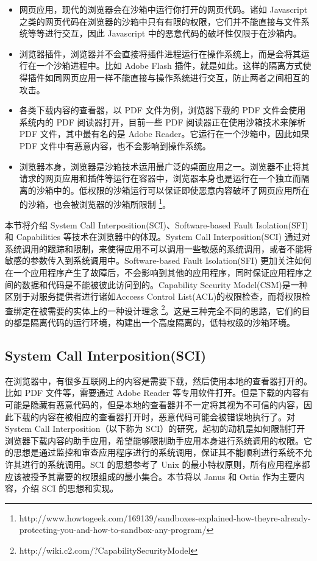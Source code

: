 \documentclass[final,5p,times]{elsarticle}
\begin{document}
\begin{itemize}
\item
网页应用，现代的浏览器会在沙箱中运行你打开的网页代码。诸如 Javascript 之类的网页代码在浏览器的沙箱中只有有限的权限，它们并不能直接与文件系统等等进行交互，因此 Javascript 中的恶意代码的破坏性仅限于在沙箱内。
\item
浏览器插件，浏览器并不会直接将插件进程运行在操作系统上，而是会将其运行在一个沙箱进程中。比如 Adobe Flash 插件，就是如此。这样的隔离方式使得插件如同网页应用一样不能直接与操作系统进行交互，防止两者之间相互的攻击。
\item
各类下载内容的查看器，以 PDF 文件为例，浏览器下载的 PDF 文件会使用系统内的 PDF 阅读器打开，目前一些 PDF 阅读器正在使用沙箱技术来解析 PDF 文件，其中最有名的是 Adobe Reader。它运行在一个沙箱中，因此如果 PDF 文件中有恶意内容，也不会影响到操作系统。
\item
浏览器本身，浏览器是沙箱技术运用最广泛的桌面应用之一。浏览器不止将其请求的网页应用和插件等运行在容器中，浏览器本身也是运行在一个独立而隔离的沙箱中的。低权限的沙箱运行可以保证即使恶意内容破坏了网页应用所在的沙箱，也会被浏览器的沙箱所限制 \footnote{http://www.howtogeek.com/169139/sandboxes-explained-how-theyre-already-protecting-you-and-how-to-sandbox-any-program/}。
\end{itemize}

本节将介绍 System Call Interposition(SCI)、Software-based Fault Isolation(SFI) 和 Capabilities 等技术在浏览器中的体现。System Call Interposition(SCI) 通过对系统调用的跟踪和限制，来使得应用不可以调用一些敏感的系统调用，或者不能将敏感的参数传入到系统调用中。Software-based Fault Isolation(SFI) 更加关注如何在一个应用程序产生了故障后，不会影响到其他的应用程序，同时保证应用程序之间的数据和代码是不能被彼此访问到的。Capability Security Model(CSM)是一种区别于对服务提供者进行诸如Acccess Control List(ACL)的权限检查，而将权限检查绑定在被需要的实体上的一种设计理念 \footnote{http://wiki.c2.com/?CapabilitySecurityModel}。这是三种完全不同的思路，它们的目的都是隔离代码的运行环境，构建出一个高度隔离的，低特权级的沙箱环境。

\subsection{System Call Interposition(SCI)}
\label{ss:sci}

在浏览器中，有很多互联网上的内容是需要下载，然后使用本地的查看器打开的。比如 PDF 文件等，需要通过 Adobe Reader 等专用软件打开。但是下载的内容有可能是隐藏有恶意代码的，但是本地的查看器并不一定将其视为不可信的内容，因此下载的内容在被相应的查看器打开时，恶意代码可能会被错误地执行了。对 System Call Interposition（以下称为 SCI）的研究，起初的动机是如何限制打开浏览器下载内容的助手应用，希望能够限制助手应用本身进行系统调用的权限。它的思想是通过监控和审查应用程序进行的系统调用，保证其不能顺利进行系统不允许其进行的系统调用。SCI 的思想参考了 Unix 的最小特权原则，所有应用程序都应该被授予其需要的权限组成的最小集合。本节将以 Janus 和 Ostia 作为主要内容，介绍 SCI 的思想和实现。
\end{document}
